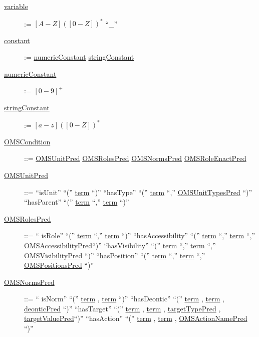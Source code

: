 \begin{description}
\item[\underline{variable}] := $\left[A-Z\right] (\left[0-Z\right])^{*}$ \textbar ``\_''
\item[\underline{constant}] := \underline{numericConstant} \textbar \underline{stringConstant} 
\item[\underline{numericConstant}] := $\left[0-9\right]^{+}$
\item[\underline{stringConstant}] := $\left[a-z\right] (\left[0-Z\right])^{*}$



\item[\underline{OMSCondition}] ::= \underline{OMSUnitPred} \textbar \underline{OMSRolesPred} \textbar \underline{OMSNormsPred} \textbar \underline{OMSRoleEnactPred}

\item[\underline{OMSUnitPred}] ::=  ``isUnit'' ``('' \underline{term} ``)'' \textbar 
		``hasType'' ``('' \underline{term} ``,'' \underline{OMSUnitTypesPred} ``)'' \textbar
		``hasParent'' ``('' \underline{term} ``,'' \underline{term} ``)''

\item[\underline{OMSRolesPred}] ::= `` isRole'' ``('' \underline{term} ``,'' \underline{term} ``)'' \textbar 
		``hasAccessibility'' ``('' \underline{term} ``,'' \underline{term} ``,'' \underline{OMSAccessibilityPred}``)'' \textbar
		``hasVisibility'' ``('' \underline{term} ``,'' \underline{term} ``,'' \underline{OMSVisibilityPred} ``)'' \textbar 
		``hasPosition'' ``('' \underline{term} ``,'' \underline{term} ``,'' \underline{OMSPositionsPred} ``)''


\item[\underline{OMSNormsPred}] ::= `` isNorm'' ``('' \underline{term} , \underline{term} ``)'' \textbar 
		``hasDeontic'' ``('' \underline{term} , \underline{term} , \underline{deonticPred} ``)'' \textbar 
                 ``hasTarget'' ``('' \underline{term} , \underline{term} , \underline{targetTypePred} , \underline{targetValuePred}``)'' \textbar 
                 ``hasAction'' ``('' \underline{term} , \underline{term} , \underline{OMSActionNamePred} ``)''                  




\end{description}
